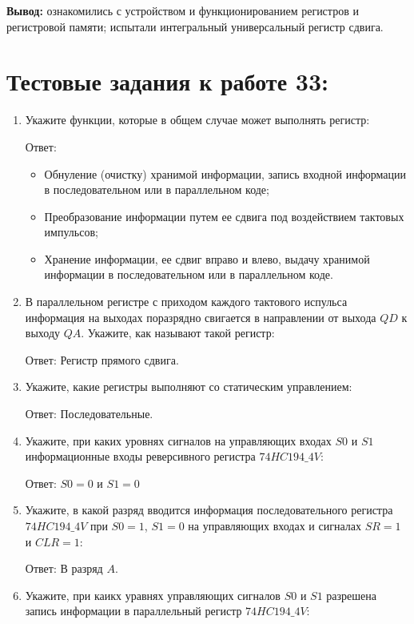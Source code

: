 \documentclass[spec, och, labwork]{shiza}
\begin{document}
  \textbf{Вывод:} ознакомились с устройством и функционированием регистров и регистровой памяти; испытали интегральный универсальный регистр сдвига.

  \section{Тестовые задания к работе 33:}

  \begin{enumerate}
    \item Укажите функции, которые в общем случае может выполнять регистр:
    
    Ответ: 
    \begin{itemize}
      \item Обнуление (очистку) хранимой информации, запись входной информации в последовательном или в параллельном коде;
      \item Преобразование информации путем ее сдвига под воздействием тактовых импульсов;
      \item Хранение информации, ее сдвиг вправо и влево, выдачу хранимой информации в последовательном или в параллельном коде.
    \end{itemize}

    \item В параллельном регистре с приходом каждого тактового испульса информация на выходах поразрядно свигается в направлении от выхода $QD$ к выходу $QA$. Укажите, как называют такой регистр:
    
    Ответ: Регистр прямого сдвига.

    \item Укажите, какие регистры выполняют со статическим управлением:
    
    Ответ: Последовательные.

    \item Укажите, при каких уровнях сигналов на управляющих входах $S0$ и $S1$ информационные входы реверсивного регистра $74HC194\_4V$:
  
    Ответ: $S0 = 0$ и $S1 = 0$

    \item Укажите, в какой разряд вводится информация последовательного регистра $74HC194\_4V$ при $S0 = 1$, $S1 = 0$ на управляющих входах и сигналах $SR = 1$ и $CLR = 1$:
  
    Ответ: В разряд $A$.

    \item Укажите, при каикх уравнях управляющих сигналов $S0$ и $S1$ разрешена запись информации в параллельный регистр $74HC194\_4V$:
    

\end{enumerate}
\end{document}

